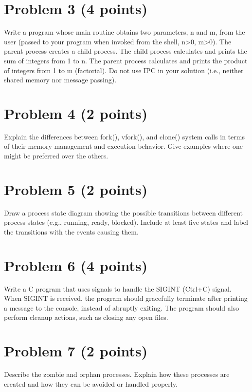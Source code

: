\documentclass{article}
\begin{document}
\section*{Problem 3 (4 points)}

Write a program whose main routine obtains two parameters, n and m, from the user (passed to your program when invoked from the shell, n>0, m>0).  The parent process creates a child process. The child process calculates and prints the sum of integers from 1 to n. The parent process calculates and prints the product of integers from 1 to m (factorial). Do not use IPC in your solution (i.e., neither shared memory nor message passing).


\section*{Problem 4 (2 points)}

Explain the differences between fork(), vfork(), and clone() system calls in terms of their memory management and execution behavior.  Give examples where one might be preferred over the others.


\section*{Problem 5 (2 points)}

Draw a process state diagram showing the possible transitions between different process states (e.g., running, ready, blocked). Include at least five states and label the transitions with the events causing them.


\section*{Problem 6 (4 points)}

Write a C program that uses signals to handle the SIGINT (Ctrl+C) signal.  When SIGINT is received, the program should gracefully terminate after printing a message to the console, instead of abruptly exiting.  The program should also perform cleanup actions, such as closing any open files.


\section*{Problem 7 (2 points)}

Describe the zombie and orphan processes. Explain how these processes are created and how they can be avoided or handled properly.
\end{document}
